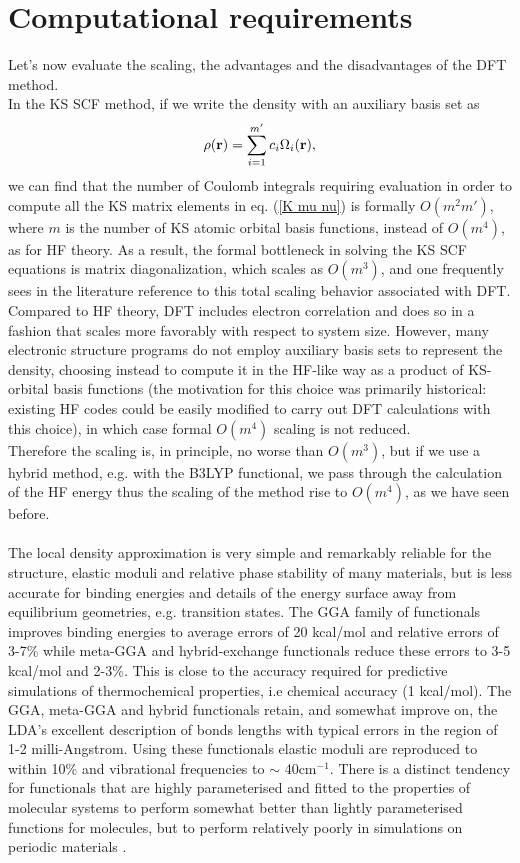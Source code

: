 \section{Computational requirements}
Let's now evaluate the scaling, the advantages and the disadvantages of the DFT method. \\
In the KS SCF method, if we write the density with an auxiliary basis set as
\begin{equation}
    \rho({\bf r}) = \sum_{i=1}^{m'} c_i \Omega_i ({\bf r}),
\end{equation}
we can find that the number of Coulomb integrals requiring evaluation in order to compute all the KS matrix elements in eq. (\ref{K mu nu}) is formally $O(m^2 m')$, where $m$ is the number of KS atomic orbital basis functions, instead of $O(m^4)$, as for HF theory. As a result, the formal bottleneck in solving the KS SCF equations is matrix diagonalization, which scales as $O(m^3)$, and one frequently sees in the literature reference to this total scaling behavior associated with DFT. \\
Compared to HF theory, DFT includes electron correlation and does so in a fashion that scales more favorably with respect to system size. However, many electronic structure programs do not employ auxiliary basis sets to represent the density, choosing instead to compute it in the HF-like way as a product of KS-orbital basis functions (the motivation for this choice was primarily historical: existing HF codes could be easily modified to carry out DFT calculations with this choice), in which case formal $O(m^4)$ scaling is not reduced. \\
Therefore the scaling is, in principle, no worse than $O(m^3)$, but if we use a hybrid method, e.g. with the B3LYP functional, we pass through the calculation of the HF energy thus the scaling of the method rise to $O(m^4)$, as we have seen before. \\
\\
The local density approximation is very simple and remarkably reliable for the structure, elastic moduli and relative phase stability of many materials, but is less accurate for binding energies and details of the energy surface away from equilibrium geometries, e.g. transition states. The GGA family of functionals improves binding energies to average errors of 20 kcal/mol and relative errors of 3-7$\%$ while meta-GGA and hybrid-exchange functionals reduce these errors to 3-5 kcal/mol and 2-3$\%$. This is close to the accuracy required for predictive simulations of thermochemical properties, i.e chemical accuracy (1 kcal/mol). The GGA, meta-GGA and hybrid functionals retain, and somewhat improve on, the LDA’s excellent description of bonds lengths with typical errors in the region of 1-2 milli-Angstrom. Using these functionals elastic moduli are reproduced to within 10$\%$ and vibrational frequencies to $\sim$ 40cm$^{-1}$. There is a distinct tendency for functionals that are highly parameterised and fitted to the properties of molecular systems to perform somewhat better than lightly parameterised functions for molecules, but to perform relatively poorly in simulations on periodic materials \cite{BibEntry2006Aug}. \\
